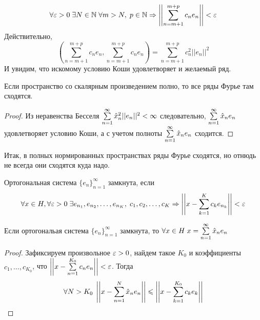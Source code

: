 \documentclass[a4paper, 12pt]{article}
\begin{document}
$$
    \forall \varepsilon>0\; \exists N\in \mathbb{N}\; \forall m>N,\; p\in \mathbb{N} \Rightarrow \left|\left|\sum\limits_{n=m+1}^{m+p}c_ne_n \right|\right| < \varepsilon
$$
Действительно,
$$
    \left(\sum\limits_{n=m+1}^{m+p}c_ne_n, \sum\limits_{n=m+1}^{m+p}c_ne_n\right) =  \sum\limits_{n=m+1}^{m+p}c_n^2 ||e_n||^2
$$
И увидим, что искомому условию Коши удовлетворяет и желаемый ряд.
\begin{Consequence}
    Если пространство со скалярным произведением полно, то все ряды Фурье там сходятся.
\end{Consequence}
\begin{proof}
    Из неравенства Бесселя
    $\sum\limits_{n=1}^{\infty} \hat{x}_n^2 ||e_n||^2 < \infty$ следовательно, $ \sum\limits_{n=1}^{\infty} \hat{x}_ne_n 
    $ удовлетворяет условию Коши, а с учетом полноты $\sum\limits_{n=1}^{\infty}\hat{x}_n e_n$ сходится.
\end{proof}
Итак, в полных нормированных пространствах ряды Фурье сходятся, но отнюдь не всегда они сходятся куда надо.
\begin{Def}
    Ортогональная система $\{e_n\}_{n=1}^{\infty}$ замкнута, если 
    $$\forall x\in H, \forall \varepsilon >0\; \exists e_{n_1}, e_{n_2}, \ldots, e_{n_K},\; c_1, c_2, \ldots, c_K \Rightarrow \left|\left|x - \sum\limits_{k=1}^{K} c_k e_{n_k}\right|\right|<\varepsilon
    $$
\end{Def}
\begin{Statement}
    Если ортогональая система $\{e_n\}_{n=1}^{\infty}$ замкнута, то $\forall x\in H\; x = \sum\limits_{n=1}^{\infty}\hat{x}_n e_{n}$
\end{Statement}
\begin{proof}
    Зафиксируем произвольное $\varepsilon >0$, найдем такое $K_0$ и коэффициенты $c_1, \ldots, c_{K_0}$, что $\left|\left| x - \sum\limits_{n=1}^{K_0} c_ne_n \right|\right| < \varepsilon$. Тогда
    $$
        \forall N>K_0 \; \left|\left|x - \sum\limits_{n=1}^{N}\hat{x}_ne_n\right|\right|\leqslant \left|\left|x - \sum\limits_{k=1}^{K_0}c_ke_k \right|\right|
    $$
\end{proof}
\end{document}

